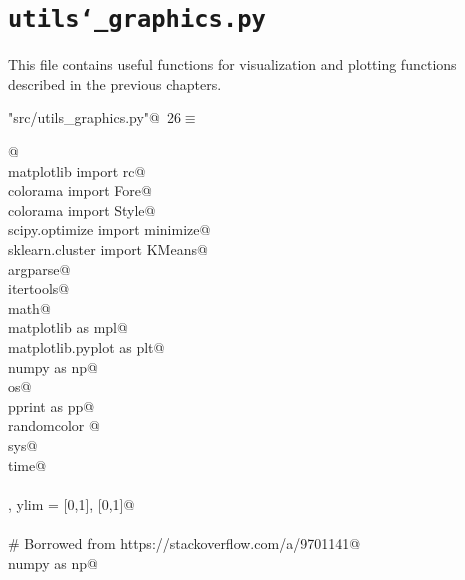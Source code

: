 \documentclass[10pt, english, oneside]{report}
\begin{document}
\begin{appendices}
\begin{flushleft}
\begin{list}{}{\setlength{\itemsep}{-\parsep}\setlength{\itemindent}{-\leftmargin}}
\item{}
\end{list}
\vspace{4ex}
\end{flushleft}
\chapter{\texttt{utils\char`_graphics.py}}

This file contains useful functions for visualization and plotting functions described in the previous chapters.
\begin{flushleft} \small\label{scrap23}\raggedright\small
{} \verb@"src/utils_graphics.py"@\nobreak\ {\footnotesize {26}}$\equiv$
\vspace{-1ex}
\begin{list}{}{} \item
\mbox{}\verb@    @\\
\mbox{}\verb@from matplotlib import rc@\\
\mbox{}\verb@from colorama import Fore@\\
\mbox{}\verb@from colorama import Style@\\
\mbox{}\verb@from scipy.optimize import minimize@\\
\mbox{}\verb@from sklearn.cluster import KMeans@\\
\mbox{}\verb@import argparse@\\
\mbox{}\verb@import itertools@\\
\mbox{}\verb@import math@\\
\mbox{}\verb@import matplotlib as mpl@\\
\mbox{}\verb@import matplotlib.pyplot as plt@\\
\mbox{}\verb@import numpy as np@\\
\mbox{}\verb@import os@\\
\mbox{}\verb@import pprint as pp@\\
\mbox{}\verb@import randomcolor @\\
\mbox{}\verb@import sys@\\
\mbox{}\verb@import time@\\
\mbox{}\verb@@\\
\mbox{}\verb@xlim, ylim = [0,1], [0,1]@\\
\mbox{}\verb@@\\
\mbox{}\verb@# Borrowed from https://stackoverflow.com/a/9701141@\\
\mbox{}\verb@import numpy as np@\\

\end{list}
\end{flushleft}
\end{appendices}
\end{document}
